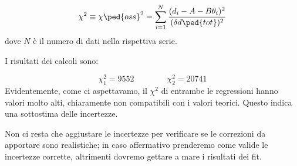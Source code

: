 \begin{equation}
    \chi^2 \equiv \chi\ped{oss}^2 = \sum_{i=1}^{N} \frac{(d_i - A - B\theta_i)^2}{(\delta d\ped{tot})^2}
\end{equation}
%
dove $N$ è il numero di dati nella rispettiva serie. 

I risultati dei calcoli sono:

\begin{equation}
    \chi_1^2 = 9552 \qquad \qquad \chi_2^2 = 20741
\end{equation}
%
Evidentemente, come ci aspettavamo, il $\chi^2$ di entrambe le regressioni hanno valori molto alti, chiaramente non compatibili con
i valori teorici. Questo indica una sottostima delle incertezze.

Non ci resta che aggiustare le incertezze per verificare se le correzioni da apportare sono realistiche; in caso affermativo
prenderemo come valide le incertezze corrette, altrimenti dovremo gettare a mare i risultati dei fit.
